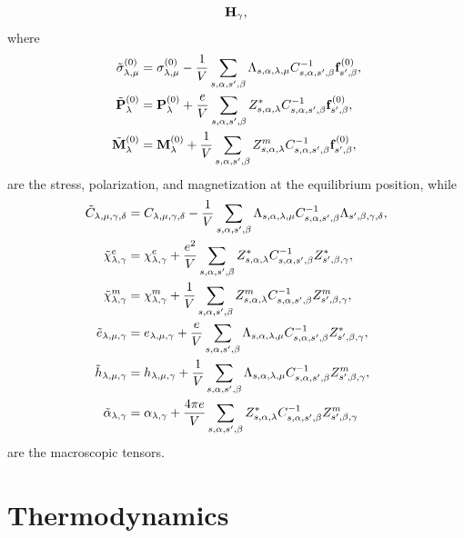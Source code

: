 \documentclass[12pt,a4paper,twoside]{report}
\begin{document}
{\begin{align}
{\bf H}_{\gamma},
\end{align}
where 
\begin{align}
\tilde \sigma^{(0)}_{\lambda,\mu}&= \sigma^{(0)}_{\lambda,\mu}
-{1\over V} \sum_{s,\alpha,s',\beta} \Lambda_{s,\alpha,\lambda,\mu}
C^{-1}_{s,\alpha,s',\beta} {\bf f}^{(0)}_{s',\beta}, \\
\tilde {\bf P}^{(0)}_\lambda&= {\bf P}^{(0)}_\lambda +{e\over V}
\sum_{s,\alpha,s',\beta} Z^*_{s,\alpha,\lambda} C^{-1}_{s,\alpha,s',\beta}
{\bf f}^{(0)}_{s',\beta}, \\
\tilde {\bf M}^{(0)}_\lambda&= {\bf M}^{(0)}_\lambda +{1\over V}
\sum_{s,\alpha,s',\beta} Z^m_{s,\alpha,\lambda} C^{-1}_{s,\alpha,s',\beta}
{\bf f}^{(0)}_{s',\beta},
\end{align}
are the stress, polarization, and magnetization at the equilibrium position,
while
\begin{align}
\tilde C_{\lambda,\mu,\gamma,\delta}&= C_{\lambda,\mu,\gamma,\delta}
-{1\over V}\sum_{s,\alpha,s',\beta} \Lambda_{s,\alpha,\lambda,\mu}
C^{-1}_{s,\alpha,s',\beta}  \Lambda_{s',\beta,\gamma,\delta},\\
\tilde \chi^e_{\lambda,\gamma}&= \chi^e_{\lambda,\gamma} 
+{e^2 \over V} \sum_{s,\alpha,s',\beta} Z^*_{s,\alpha,\lambda}
C^{-1}_{s,\alpha,s',\beta}  Z^*_{s',\beta,\gamma},\\
\tilde \chi^m_{\lambda,\gamma}&= \chi^m_{\lambda,\gamma} 
+{1 \over V} \sum_{s,\alpha,s',\beta} Z^m_{s,\alpha,\lambda}
C^{-1}_{s,\alpha,s',\beta}  Z^m_{s',\beta,\gamma}, \\
\tilde e_{\lambda,\mu,\gamma}&= e_{\lambda,\mu,\gamma}
+{e\over V}\sum_{s,\alpha,s',\beta} 
\Lambda_{s,\alpha,\lambda,\mu} C^{-1}_{s,\alpha,s',\beta} 
Z^*_{s',\beta,\gamma},\\
\tilde h_{\lambda,\mu,\gamma}&= h_{\lambda,\mu,\gamma}
+{1\over V}\sum_{s,\alpha,s',\beta} \Lambda_{s,\alpha,\lambda,\mu}
C^{-1}_{s,\alpha,s',\beta} Z^m_{s',\beta,\gamma},\\
\tilde \alpha_{\lambda,\gamma}&= \alpha_{\lambda,\gamma}
+{4 \pi e \over V}\sum_{s,\alpha,s',\beta} Z^*_{s,\alpha,\lambda}
C^{-1}_{s,\alpha,s',\beta}  Z^m_{s',\beta,\gamma}
\end{align}
are the macroscopic tensors.
}
\\
\newpage

{\color{dark-blue}\chapter{Thermodynamics}}
\color{black}
\end{document}
